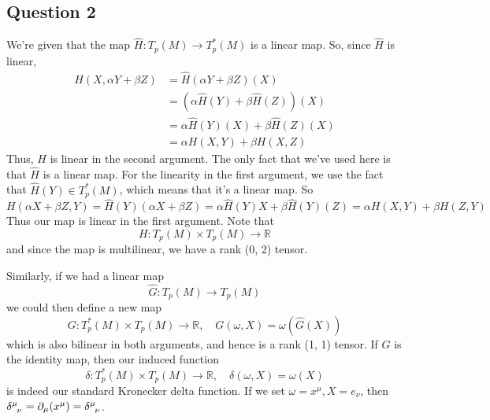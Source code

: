 \subsection{Question 2} 
We're given that the map $\hat{ H }  : T_p (M) \rightarrow T_p^* ( M ) $ is a linear map. So, since $\hat{ H } $ is linear, 
\begin{align*} 
H ( X, \alpha Y + \beta Z ) & = \hat{H} ( \alpha Y + \beta Z) ( X) \\ &= ( \alpha \hat{ H} ( Y ) + \beta \hat{H} ( Z) ) ( X) \\
&= \alpha \hat{H}( Y) ( X) + \beta \hat{H} (Z) ( X) \\
&= \alpha H ( X, Y ) + \beta H ( X, Z) 
\end{align*} 
Thus, $H$ is linear in the second argument. The only fact that we've used here is that $\hat{H}$ is a linear map. For the linearity in the first argument, we use the fact that $\hat{H} (Y) \in T_p^* (M)$, which means that it's a linear map. So 
\[ 
H ( \alpha X + \beta Z, Y ) = \hat{H}( Y) ( \alpha X + \beta Z)  = \alpha \hat{H} (Y) X + \beta \hat{H} (Y) ( Z)  = \alpha H(X, Y ) + \beta H(Z, Y ) 
\] Thus our map is linear in the first argument. Note that
\[ 
H : T_p ( M) \times T_p ( M) \rightarrow \mathbb{R} 
\] and since the map is multilinear, we have a rank (0, 2) tensor.

Similarly, if we had a linear map 
\[ 
\hat{G} : T_p( M ) \rightarrow T_p( M) 
\]
we could then define a new map 
\[ 
G : T_p^* ( M) \times T_p(M) \rightarrow \mathbb{ R}, \quad G( \omega, X)  = \omega ( \hat{G} ( X)) \] 
which is also bilinear in both arguments, and hence is a rank (1, 1) tensor. If $G$ is the identity map, then our induced function 
\[ 
\delta : T_p^* ( M) \times T_p( M ) \rightarrow \mathbb{R}, \quad \delta ( \omega, X ) = \omega (X) 
\] is indeed our standard Kronecker delta function. If we set $\omega = x^\mu, X = e_\nu$, then $\delta\indices{^\mu_\nu} = \partial_\mu(x^\mu) = \delta\indices{^\mu_\nu}$. 

\pagebreak 
